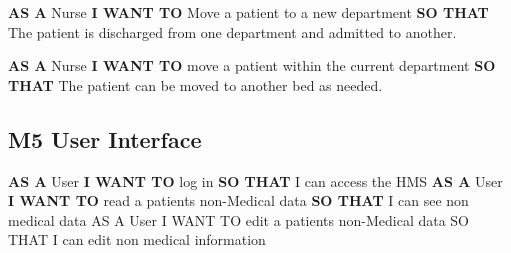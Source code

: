 \textbf{AS A} Nurse\newline
\textbf{I WANT TO} Move a patient to a new department\newline
\textbf{SO THAT} The patient is discharged from one department and admitted to another.\newline
\newline

\textbf{AS A} Nurse\newline
\textbf{I WANT TO} move a patient within the current department\newline
\textbf{SO THAT} The patient can be moved to another bed as needed.\newline
\newline

\subsection*{M5 User Interface}
\textbf{AS A} User\newline
\textbf{I WANT TO} log in\newline
\textbf{SO THAT} I can access the HMS\newline
\newline
\textbf{AS A} User\newline
\textbf{I WANT TO} read a patients non-Medical data\newline
\textbf{SO THAT} I can see non medical data\newline
\newline
AS A User\newline
I WANT TO edit a patients non-Medical data\newline
SO THAT I can edit non medical information\newline
\newline

